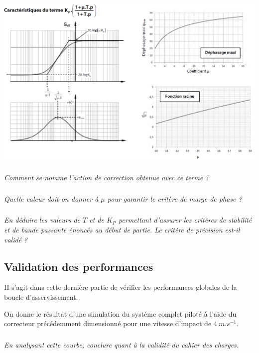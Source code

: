 \documentclass[10pt,fleqn]{article} %
\begin{document}
\begin{multicols}{2}
\begin{center}
\includegraphics[width=\linewidth]{images/fig_05}
\end{center}

\subparagraph{}\textit{Comment se nomme l'action de correction obtenue avec ce terme ? }
\ifprof
\begin{corrige}
\end{corrige}
\else
\fi


\subparagraph{}\textit{Quelle valeur doit-on donner à $\mu$ pour garantir le critère de marge de phase ? }
\ifprof
\begin{corrige}
\end{corrige}
\else
\fi


\subparagraph{}\textit{En déduire les valeurs de $T$ et de $K_P$ permettant d'assurer les critères de stabilité et de bande passante énoncés au début de partie. Le critère de précision est-il validé ?}
\ifprof
\begin{corrige}
\end{corrige}
\else
\fi

\subsection*{Validation des performances}

\begin{obj}
II s'agit dans cette dernière partie de vérifier les performances globales de la boucle d'asservissement.
\end{obj}

On donne le résultat d'une simulation du système complet piloté à l'aide du correcteur précédemment dimensionné pour une vitesse d'impact de $\SI{4}{m.s^{-1}}$.

\subparagraph{}\textit{En analysant cette courbe, conclure quant à la validité du cahier des charges.}
\ifprof
\begin{corrige}
\end{corrige}
\else
\fi



\end{multicols}
\end{document}
